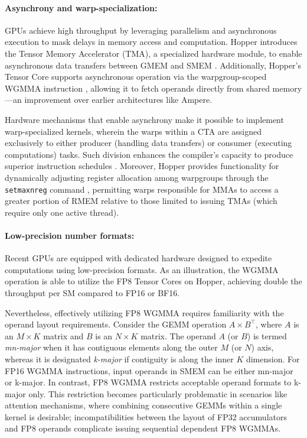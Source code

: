 \paragraph{Asynchrony and warp-specialization:}

GPUs achieve high throughput by leveraging parallelism and asynchronous execution to mask delays in memory access and computation. Hopper introduces the Tensor Memory Accelerator (TMA), a specialized hardware module, to enable asynchronous data transfers between GMEM and SMEM \cite[\S7.29]{cuda}. Additionally, Hopper's Tensor Core supports asynchronous operation via the warpgroup-scoped WGMMA instruction \cite[\S9.7.14]{ptx}, allowing it to fetch operands directly from shared memory—an improvement over earlier architectures like Ampere.

Hardware mechanisms that enable asynchrony make it possible to implement warp-specialized kernels, wherein the warps within a CTA are assigned exclusively to either producer (handling data transfers) or consumer (executing computations) tasks. Such division enhances the compiler’s capacity to produce superior instruction schedules \citep{warp-specialization-2011}. Moreover, Hopper provides functionality for dynamically adjusting register allocation among warpgroups through the \verb|setmaxnreg| command \cite[\S9.7.17.1]{ptx}, permitting warps responsible for MMAs to access a greater portion of RMEM relative to those limited to issuing TMAs (which require only one active thread).

\paragraph{Low-precision number formats:}
\label{sec:low-precision-gpu}
Recent GPUs are equipped with dedicated hardware designed to expedite computations using low-precision formats. As an illustration, the WGMMA operation is able to utilize the FP8 Tensor Cores on Hopper, achieving double the throughput per SM compared to FP16 or BF16.

Nevertheless, effectively utilizing FP8 WGMMA requires familiarity with the operand layout requirements. Consider the GEMM operation $A \times B^{\top}$, where $A$ is an $M\times K$ matrix and $B$ is an $N\times K$ matrix. The operand $A$ (or $B$) is termed \emph{mn-major} when it has contiguous elements along the outer $M$ (or $N$) axis, whereas it is designated \emph{k-major} if contiguity is along the inner $K$ dimension. For FP16 WGMMA instructions, input operands in SMEM can be either mn-major or k-major. In contrast, FP8 WGMMA restricts acceptable operand formats to k-major only. This restriction becomes particularly problematic in scenarios like attention mechanisms, where combining consecutive GEMMs within a single kernel is desirable; incompatibilities between the layout of FP32 accumulators and FP8 operands complicate issuing sequential dependent FP8 WGMMAs.

